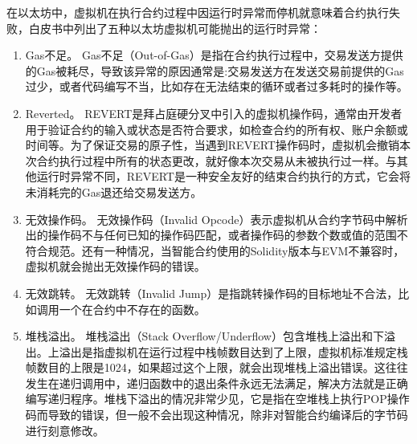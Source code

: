 在以太坊中，虚拟机在执行合约过程中因运行时异常而停机就意味着合约执行失败，白皮书中列出了五种以太坊虚拟机可能抛出的运行时异常：
\begin{enumerate}[label=(\arabic*)]
    \item Gas不足。
    Gas不足（Out-of-Gas）是指在合约执行过程中，交易发送方提供的Gas被耗尽，导致该异常的原因通常是:交易发送方在发送交易前提供的Gas过少，或者代码编写不当，比如存在无法结束的循环或者过多耗时的操作等。
    \item Reverted。
    REVERT是拜占庭硬分叉中引入的虚拟机操作码，通常由开发者用于验证合约的输入或状态是否符合要求，如检查合约的所有权、账户余额或时间等。为了保证交易的原子性，当遇到REVERT操作码时，虚拟机会撤销本次合约执行过程中所有的状态更改，就好像本次交易从未被执行过一样。与其他运行时异常不同，REVERT是一种安全友好的结束合约执行的方式，它会将未消耗完的Gas退还给交易发送方。
    \item 无效操作码。
    无效操作码（Invalid Opcode）表示虚拟机从合约字节码中解析出的操作码不与任何已知的操作码匹配，或者操作码的参数个数或值的范围不符合规范。还有一种情况，当智能合约使用的Solidity版本与EVM不兼容时，虚拟机就会抛出无效操作码的错误。
    \item 无效跳转。
    无效跳转（Invalid Jump）是指跳转操作码的目标地址不合法，比如调用一个在合约中不存在的函数。
    \item 堆栈溢出。
    堆栈溢出（Stack Overflow/Underflow）包含堆栈上溢出和下溢出。上溢出是指虚拟机在运行过程中栈帧数目达到了上限，虚拟机标准规定栈帧数目的上限是1024，如果超过这个上限，就会出现堆栈上溢出错误。这往往发生在递归调用中，递归函数中的退出条件永远无法满足，解决方法就是正确编写递归程序。堆栈下溢出的情况非常少见，它是指在空堆栈上执行POP操作码而导致的错误，但一般不会出现这种情况，除非对智能合约编译后的字节码进行刻意修改。
\end{enumerate}

